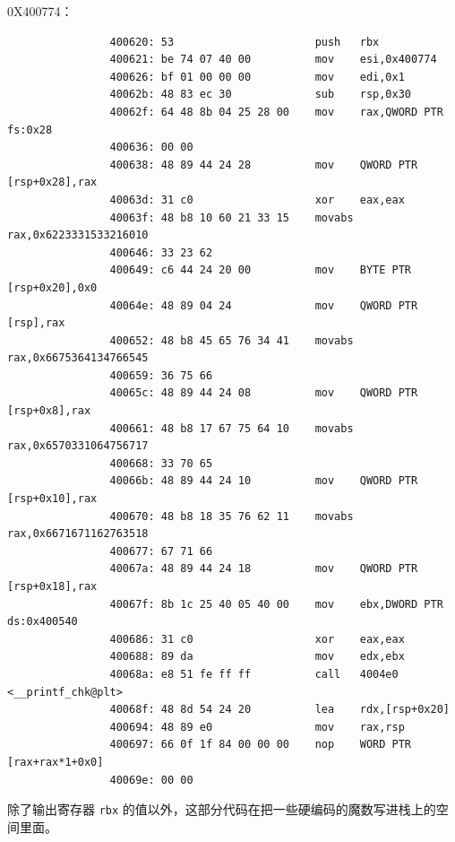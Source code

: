 \documentclass{ctexbeamer}
\begin{document}
    \begin{frame}[fragile]

        0X400774：
    
        {
            \tiny
            \begin{verbatim}
                400620:	53                   	push   rbx
                400621:	be 74 07 40 00       	mov    esi,0x400774
                400626:	bf 01 00 00 00       	mov    edi,0x1
                40062b:	48 83 ec 30          	sub    rsp,0x30
                40062f:	64 48 8b 04 25 28 00 	mov    rax,QWORD PTR fs:0x28
                400636:	00 00 
                400638:	48 89 44 24 28       	mov    QWORD PTR [rsp+0x28],rax
                40063d:	31 c0                	xor    eax,eax
                40063f:	48 b8 10 60 21 33 15 	movabs rax,0x6223331533216010
                400646:	33 23 62 
                400649:	c6 44 24 20 00       	mov    BYTE PTR [rsp+0x20],0x0
                40064e:	48 89 04 24          	mov    QWORD PTR [rsp],rax
                400652:	48 b8 45 65 76 34 41 	movabs rax,0x6675364134766545
                400659:	36 75 66 
                40065c:	48 89 44 24 08       	mov    QWORD PTR [rsp+0x8],rax
                400661:	48 b8 17 67 75 64 10 	movabs rax,0x6570331064756717
                400668:	33 70 65 
                40066b:	48 89 44 24 10       	mov    QWORD PTR [rsp+0x10],rax
                400670:	48 b8 18 35 76 62 11 	movabs rax,0x6671671162763518
                400677:	67 71 66 
                40067a:	48 89 44 24 18       	mov    QWORD PTR [rsp+0x18],rax
                40067f:	8b 1c 25 40 05 40 00 	mov    ebx,DWORD PTR ds:0x400540
                400686:	31 c0                	xor    eax,eax
                400688:	89 da                	mov    edx,ebx
                40068a:	e8 51 fe ff ff       	call   4004e0 <__printf_chk@plt>
                40068f:	48 8d 54 24 20       	lea    rdx,[rsp+0x20]
                400694:	48 89 e0             	mov    rax,rsp
                400697:	66 0f 1f 84 00 00 00 	nop    WORD PTR [rax+rax*1+0x0]
                40069e:	00 00 
            \end{verbatim}
        }

        \pause 除了输出寄存器 \texttt{rbx} 的值以外，这部分代码在把一些硬编码的魔数写进栈上的空间里面。
    
    \end{frame}
\end{document}
